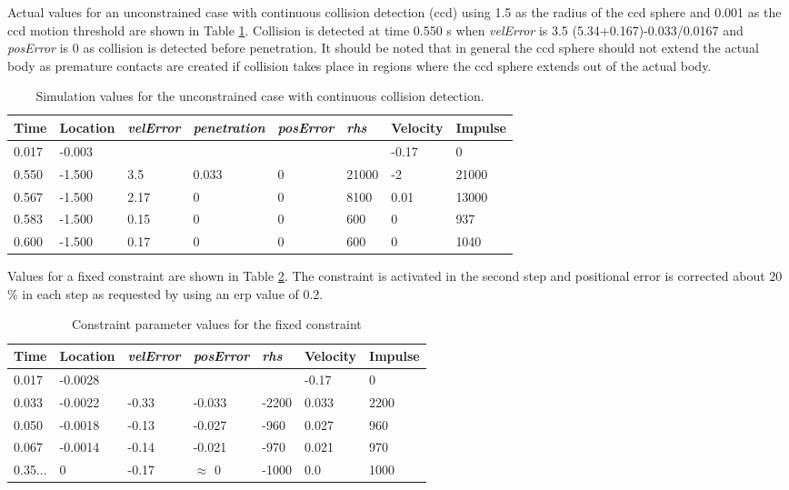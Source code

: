Actual values for an unconstrained case with continuous collision detection (ccd) using 1.5 
as the radius of the ccd sphere and 0.001 as the ccd motion threshold
are shown in Table \ref{tab:freeBlockValuesWithCcd}. Collision is detected at time 0.550 s when
{\it velError} is  3.5 (5.34+0.167)-0.033/0.0167 and
{\it posError} is  0 as collision is detected before penetration. 
It should be noted that in general the ccd sphere should not extend the actual body as 
premature contacts are created if collision takes place in regions where the ccd sphere extends out of the actual body.

\begin {table}[htb!]
\caption {Simulation values for the unconstrained case with continuous collision detection. } 
\label{tab:freeBlockValuesWithCcd} 
\begin{center}
\begin{tabular}{|l| l|l| l|l|l|l|l|}
\hline
{\bf Time} & 
{\bf Location} &
{\it velError} & {\it penetration} & {\it posError} & {\it rhs} &
{\bf Velocity} & 
{\bf Impulse} \\  \hline
0.017 &  -0.003 & & & &  &-0.17 & 0 \\  \hline
0.550 &  -1.500 & 3.5 & 0.033 & 0 & 21000& -2 & 21000 \\  \hline
0.567 &  -1.500 & 2.17 & 0 & 0  &  8100 & 0.01 & 13000 \\  \hline
0.583 &  -1.500 & 0.15 & 0 & 0 & 600  & 0 & 937 \\  \hline
0.600 &  -1.500 & 0.17 & 0 & 0 & 600  & 0 & 1040 \\  \hline
\end {tabular}
\end{center}
\end {table}

Values for a fixed constraint are shown in Table
\ref{tab:fixedBlockValues}. The constraint is activated in the second step and positional error is corrected
about 20 \% in each step as requested by using an erp value of 0.2.

\begin {table}[htb!]
\caption {Constraint parameter values for the fixed constraint} 
\label{tab:fixedBlockValues} 
\begin{center}
\begin{tabular}{|l|l| l| l|l|l|l|}
\hline
{\bf Time} & 
{\bf Location} &
{\it velError} & {\it posError} & {\it rhs} &
{\bf Velocity} & 
{\bf Impulse} \\  \hline
0.017 & -0.0028 & & & 	 & -0.17 & 0 \\  \hline
0.033 & -0.0022 & -0.33 & -0.033 & -2200 & 0.033 & 2200 \\  \hline
0.050 & -0.0018 & -0.13 & -0.027 & -960 & 0.027 & 960 \\  \hline
0.067 & -0.0014 &-0.14 & -0.021 & -970 & 0.021 & 970 \\  \hline
0.35... & 0 &-0.17 & $\approx$ 0 & -1000 &0.0 & 1000 \\  \hline
\end {tabular}
\end{center}
\end {table}

